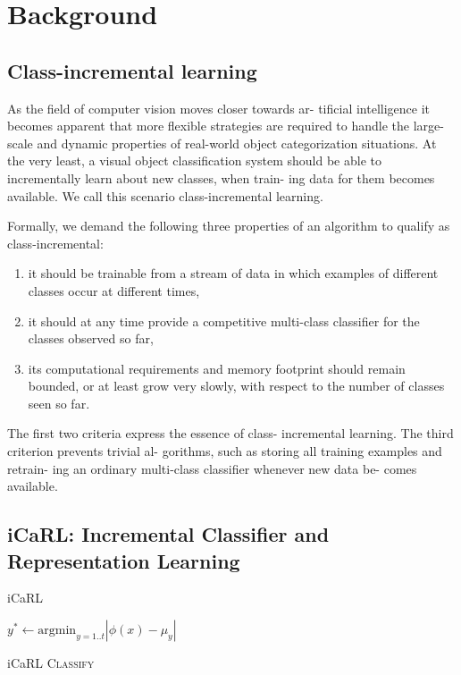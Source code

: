 
\section{Background}
\label{sec:background}

\subsection{Class-incremental learning}
\label{sec:cil}

As the field of computer vision moves closer towards ar- tificial intelligence it becomes apparent that more flexible strategies are required to handle the large-scale and dynamic properties of real-world object categorization situations. At the very least, a visual object classification system should be able to incrementally learn about new classes, when train- ing data for them becomes available. We call this scenario class-incremental learning.

Formally, we demand the following three properties of an algorithm to qualify as class-incremental:
\begin{enumerate}
\item it should be trainable from a stream of data in which examples of different classes occur at different times,
\item it should at any time provide a competitive multi-class classifier for the classes observed so far,
\item its computational requirements and memory footprint should remain bounded, or at least grow very slowly, with respect to the number of classes seen so far.
\end{enumerate}


The first two criteria express the essence of class- incremental learning. The third criterion prevents trivial al- gorithms, such as storing all training examples and retrain- ing an ordinary multi-class classifier whenever new data be- comes available.

\subsection{iCaRL: Incremental Classifier and Representation Learning}
\label{sec:icarl}
iCaRL

\begin{algorithm}[ht]
  $y^{*} \leftarrow \textrm{argmin}_{y = 1..t} \left| \phi(x) - \mu_y \right|$  \\
  
\caption{ iCaRL \textsc{Classify} \label{alg:icarl_classify}}
\end{algorithm}

